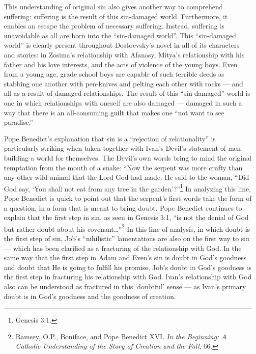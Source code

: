 This understanding of original sin also gives another way to comprehend suffering: suffering is the result of this sin-damaged world. Furthermore, it enables an escape the problem of necessary suffering. Instead, suffering is unavoidable as all are born into the ``sin-damaged world''. This ``sin-damaged world'' is clearly present throughout Dostoevsky's novel in all of its characters and stories: in Zosima's relationship with Afanasy, Mitya's relationship with his father and his love interests, and the acts of violence of the young boys. Even from a young age, grade school boys are capable of such terrible deeds as stabbing one another with pen-knives and pelting each other with rocks --- and all as a result of damaged relationships. The result of this ``sin-damaged'' world is one in which relationships with oneself are also damaged --- damaged in such a way that there is an all-consuming guilt that makes one ``not want to see paradise.''

Pope Benedict's explanation that sin is a ``rejection of relationality'' is particularly striking when taken together with Ivan's Devil's statement of men building a world for themselves. The Devil's own words bring to mind the original temptation from the mouth of a snake: ``Now the serpent was more crafty than any other wild animal that the Lord God had made. He said to the woman, ``Did God say, `You shall not eat from any tree in the garden'?''\footnote{Genesis 3:1.} In analyzing this line, Pope Benedict is quick to point out that the serpent's first words take the form of a question, in a form that is meant to bring doubt. Pope Benedict continues to explain that the first step in sin, as seen in Genesis 3:1, ``is not the denial of God but rather doubt about his covenant\ldots''\footnote{Ramsey, O.P., Boniface, and Pope Benedict XVI. \emph{In the Beginning: A Catholic Understanding of the Story of Creation and the Fall}, 66.} In this line of analysis, in which doubt is the first step of sin, Job's ``nihilistic'' lamentations are also on the first way to sin --- which has been clarified as a fracturing of the relationship with God. In the same way that the first step in Adam and Even's sin is doubt in God's goodness and doubt that He is going to fulfill his promise, Job's doubt in God's goodness is the first step in fracturing his relationship with God. Ivan's relationship with God also can be understood as fractured in this `doubtful' sense --- as Ivan's primary doubt is in God's goodness and the goodness of creation. 

